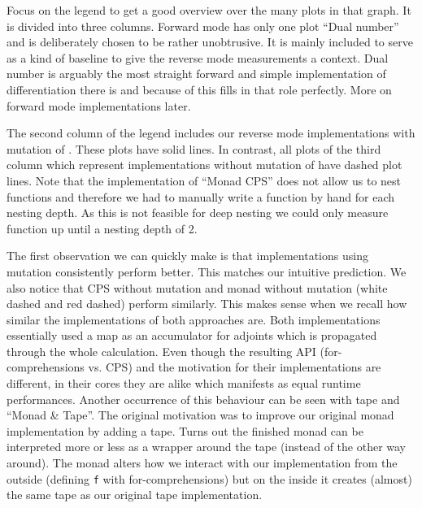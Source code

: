 Focus on the legend to get a good overview over the many plots in that graph. It is divided into three columns. Forward mode has only one plot ``Dual number'' and is deliberately chosen to be rather unobtrusive. It is mainly included to serve as a kind of baseline to give the reverse mode measurements a context. Dual number is arguably the most straight forward and simple implementation of differentiation there is and because of this fills in that role perfectly. More on forward mode implementations later.

The second column of the legend includes our reverse mode implementations with mutation of . These plots have solid lines. In contrast, all plots of the third column which represent implementations without mutation of  have dashed plot lines. Note that the implementation of ``Monad CPS'' does not allow us to nest functions and therefore we had to manually write a function by hand for each nesting depth. As this is not feasible for deep nesting we could only measure function up until a nesting depth of 2.

The first observation we can quickly make is that implementations using mutation consistently perform better. This matches our intuitive prediction. We also notice that CPS without mutation and monad without mutation (white dashed and red dashed) perform similarly. This makes sense when we recall how similar the implementations of both approaches are. Both implementations essentially used a map as an accumulator for adjoints which is propagated through the whole calculation. Even though the resulting API (for-comprehensions vs. CPS) and the motivation for their implementations are different, in their cores they are alike which manifests as equal runtime performances. Another occurrence of this behaviour can be seen with tape and ``Monad \& Tape''. The original motivation was to improve our original monad implementation by adding a tape. Turns out the finished monad can be interpreted more or less as a wrapper around the tape (instead of the other way around). The monad alters how we interact with our implementation from the outside (defining \lstinline{f} with for-comprehensions) but on the inside it creates (almost) the same tape as our original tape implementation.

